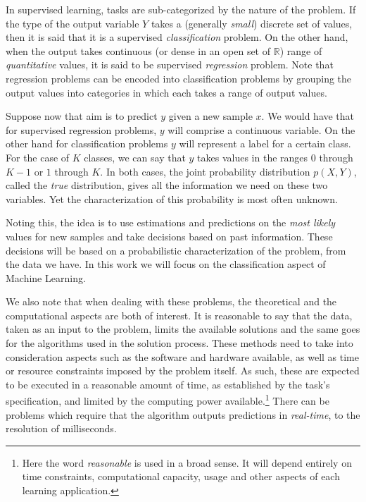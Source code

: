 In supervised learning, tasks are sub-categorized by the nature of the problem.
If the type of the output variable $Y$ takes a (generally \textit{small}) discrete set of values, then it is said that it is a supervised \textit{classification} problem.
On the other hand, when the output takes continuous (or dense in an open set of $\mathbb{R}$) range of \textit{quantitative} values, it is said to be supervised \textit{regression} problem.
Note that regression problems can be encoded into classification problems by grouping the output values into categories in which each takes a range of output values.

Suppose now that  aim is to predict $y$ given a new sample $x$.
We would have that for supervised regression problems, $y$ will comprise a continuous variable.
On the other hand for classification problems $y$ will represent a label for a certain class.
For the case of $K$ classes, we can say that $y$ takes values in the ranges $0$ through $K-1$ or $1$ through $K$.
In both cases, the joint probability distribution $p(X, Y)$, called the \textit{true} distribution, gives all the information we need on these two variables.
Yet the characterization of this probability is most often unknown.

Noting this, the idea is to use estimations and predictions on the \textit{most likely} values for new samples and take decisions based on past information.
These decisions will be based on a probabilistic characterization of the problem, from the data we have.
In this work we will focus on the classification aspect of Machine Learning.

We also note that when dealing with these problems, the theoretical and the computational aspects are both of interest.
It is reasonable to say that the data, taken as an input to the problem, limits the available solutions and the same goes for the algorithms used in the solution process.
These methods need to take into consideration aspects such as the software and hardware available, as well as time or resource constraints imposed by the problem itself.
As such, these are expected to be executed in a reasonable amount of time, as established by the task's specification, and limited by the computing power available.\footnote{Here the word \textit{reasonable} is used in a broad sense.
It will depend entirely on time constraints, computational capacity, usage and other aspects of each learning application.} There can be problems which require that the algorithm outputs predictions in \textit{real-time}, to the resolution of milliseconds.

